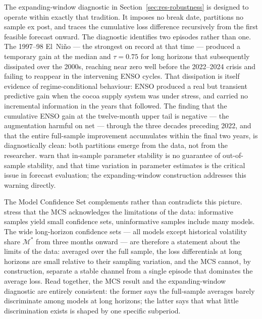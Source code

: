 The expanding-window diagnostic in Section~\ref{sec:res-robustness} is
designed to operate within exactly that tradition. It imposes no break date,
partitions no sample ex post, and traces the cumulative loss difference
recursively from the first feasible forecast onward. The diagnostic
identifies two episodes rather than one. The 1997--98 El~Ni\~no --- the
strongest on record at that time --- produced a temporary gain at the
median and $\tau = 0.75$ for long horizons that subsequently dissipated
over the 2000s, reaching near zero well before the 2022--2024 crisis and
failing to reappear in the intervening ENSO cycles. That dissipation is
itself evidence of regime-conditional behaviour: ENSO produced a real but
transient predictive gain when the cocoa supply system was under stress,
and carried no incremental information in the years that followed. The
finding that the cumulative ENSO gain at the twelve-month upper tail is
negative --- the augmentation harmful on net --- through the three decades
preceding 2022, and that the entire full-sample improvement accumulates
within the final two years, is diagnostically clean: both partitions
emerge from the data, not from the researcher. \textcite{poonForecastingVolatilityFinancial} warn that
in-sample parameter stability is no guarantee of out-of-sample stability,
and that time variation in parameter estimates is the critical issue in
forecast evaluation; the expanding-window construction addresses this
warning directly.

The Model Confidence Set complements rather than contradicts this picture.
\textcite{hansen2011model} stress that the MCS acknowledges the limitations
of the data: informative samples yield small confidence sets, uninformative
samples include many models. The wide long-horizon confidence sets --- all
models except historical volatility share $\mathcal{M}^*$ from three months
onward --- are therefore a statement about the limits of the data: averaged
over the full sample, the loss differentials at long horizons are small
relative to their sampling variation, and the MCS cannot, by construction,
separate a stable channel from a single episode that dominates the average
loss. Read together, the MCS result and the expanding-window diagnostic are
entirely consistent: the former says the full-sample averages barely
discriminate among models at long horizons; the latter says that what
little discrimination exists is shaped by one specific subperiod.

